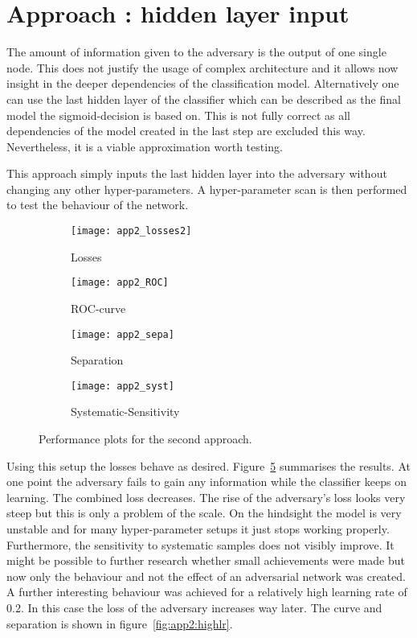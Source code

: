\section{Approach : hidden layer input}

The amount of information given to the adversary is the output of one single node. This does not justify the usage of complex architecture and it allows now insight in the deeper dependencies of the classification model. Alternatively one can use the last hidden layer of the classifier which can be described as the final model the sigmoid-decision is based on. This is not fully correct as all dependencies of the model created in the last step are excluded this way. Nevertheless, it is a viable approximation worth testing.

This approach simply inputs the last hidden layer into the adversary without changing any other hyper-parameters. A hyper-parameter scan is then performed to test the behaviour of the network.
%
\begin{figure}[htbp]
    \centering
    \begin{subfigure}[b]{0.45\textwidth}
        \texttt{[image: app2\_losses2]}
        \caption{Losses}
        \label{fig:app2:losses}
    \end{subfigure}
\quad
    \begin{subfigure}[b]{0.45\textwidth}
        \texttt{[image: app2\_ROC]}
        \caption{ROC-curve}
        \label{fig:app2:ROC}
    \end{subfigure}

    \begin{subfigure}[b]{0.45\textwidth}
		\texttt{[image: app2\_sepa]}
		\caption{Separation}
		\label{fig:app2:sepa}
	\end{subfigure}
\quad
	\begin{subfigure}[b]{0.45\textwidth}
		\texttt{[image: app2\_syst]}
		\caption{Systematic-Sensitivity}
		\label{fig:app2:syst}
	\end{subfigure}
    \caption{Performance plots for the second approach.}
	\label{fig:app2}
\end{figure}
%
%
Using this setup the losses behave as desired. Figure~\ref{fig:app2} summarises the results. At one point the adversary fails to gain any information while the classifier keeps on learning. The combined loss decreases. The rise of the adversary's loss looks very steep but this is only a problem of the scale.  On the hindsight the model is very unstable and for many hyper-parameter setups it just stops working properly. Furthermore, the sensitivity to systematic samples does not visibly improve. It might be possible to further research whether small achievements were made but now only the behaviour and not the effect of an adversarial network was created.
A further interesting behaviour was achieved for a relatively high learning rate of \num{0.2}. In this case the loss of the adversary increases way later. The curve and separation is shown in figure~\ref{fig:app2:highlr}.

